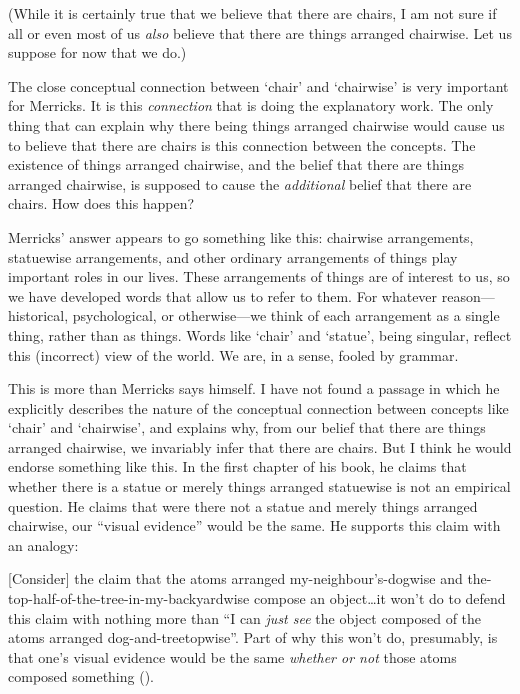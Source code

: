 \documentclass[11pt]{article}
\newenvironment{squote}{%
\begin{spacing}{1}
       	\begin{list}{}{%
\setlength{\labelwidth}{0pt}%
\rightmargin\leftmargin%
}
\item\relax
}{%
\end{list}%
\end{spacing}
}
\begin{document}
\begin{spacing}{1.25}
(While it is certainly true that we believe that there are chairs, I
am not sure if all or even most of us {\em also} believe that there
are things arranged chairwise.  Let us suppose for now that we do.)

The close conceptual connection between `chair' and `chairwise' is
very important for Merricks.  It is this {\em connection} that is
doing the explanatory work.  The only thing that can explain why there
being things arranged chairwise would cause us to believe that there
are chairs is this connection between the concepts.  The existence of
things arranged chairwise, and the belief that there are things
arranged chairwise, is supposed to cause the {\em additional} belief
that there are chairs.  How does this happen?

Merricks' answer appears to go something like this: chairwise
arrangements, statuewise arrangements, and other ordinary arrangements
of things play important roles in our lives.  These arrangements of
things are of interest to us, so we have developed words that allow us
to refer to them.  For whatever reason---historical, psychological, or
otherwise---we think of each arrangement as a single thing, rather
than as things.  Words like `chair' and `statue', being singular,
reflect this (incorrect) view of the world.  We are, in a sense,
fooled by grammar.

This is more than Merricks says himself.  I have not found a passage
in which he explicitly describes the nature of the conceptual
connection between concepts like `chair' and `chairwise', and explains
why, from our belief that there are things arranged chairwise, we
invariably infer that there are chairs.  But I think he would endorse
something like this.  In the first chapter of his book, he claims that
whether there is a statue or merely things arranged statuewise is not
an empirical question.  He claims that were there not a statue and
merely things arranged chairwise, our ``visual evidence'' would be the
same.  He supports this claim with an analogy:

\begin{squote}
{[}Consider{]} the claim that the atoms arranged
my-neighbour's-dogwise and the-top-half-of-the-tree-in-my-backyardwise
compose an object\ldots it won't do to defend this claim with nothing
more than ``I can \emph{just see} the object composed of the atoms
arranged dog-and-treetopwise''. Part of why this won't do, presumably,
is that one's visual evidence would be the same \emph{whether or not}
those atoms composed something (\citeyear[8--9]{merricks2001a}).
\end{squote}


\end{spacing}
\end{document}
